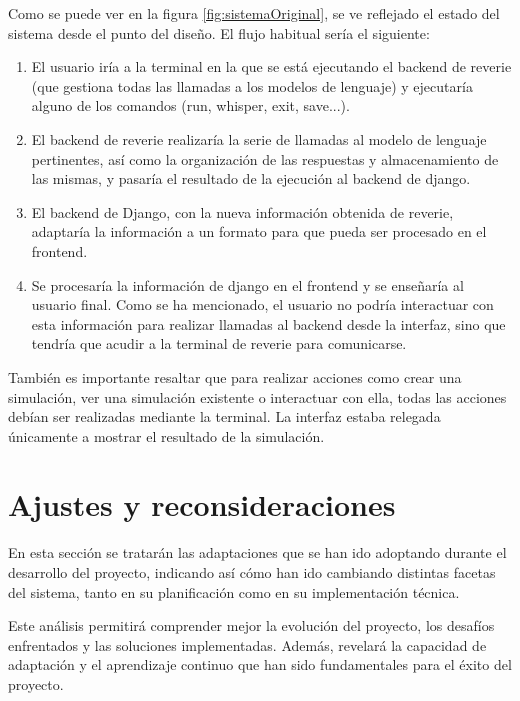 Como se puede ver en la figura \ref{fig:sistemaOriginal}, se ve reflejado el estado del sistema desde el punto del diseño. El flujo habitual sería el siguiente:

\begin{enumerate}
	\item El usuario iría a la terminal en la que se está ejecutando el backend de reverie (que gestiona todas las llamadas a los modelos de lenguaje) y ejecutaría alguno de los comandos (run, whisper, exit, save...).
	
	\item El backend de reverie realizaría la serie de llamadas al modelo de lenguaje pertinentes, así como la organización de las respuestas y almacenamiento de las mismas, y pasaría el resultado de la ejecución al backend de django.
	
	\item El backend de Django, con la nueva información obtenida de reverie, adaptaría la información a un formato para que pueda ser procesado en el frontend.
	
	\item Se procesaría la información de django en el frontend y se enseñaría al usuario final. Como se ha mencionado, el usuario no podría interactuar con esta información para realizar llamadas al backend desde la interfaz, sino que tendría que acudir a la terminal de reverie para comunicarse.
	
\end{enumerate}

También es importante resaltar que para realizar acciones como crear una simulación, ver una simulación existente o interactuar con ella, todas las acciones debían ser realizadas mediante la terminal. La interfaz estaba relegada únicamente a mostrar el resultado de la simulación.

\section{Ajustes y reconsideraciones}

En esta sección se tratarán las adaptaciones que se han ido adoptando durante el desarrollo del proyecto, indicando así cómo han ido cambiando distintas facetas del sistema, tanto en su planificación como en su implementación técnica.

Este análisis permitirá comprender mejor la evolución del proyecto, los desafíos enfrentados y las soluciones implementadas. Además, revelará la capacidad de adaptación y el aprendizaje continuo que han sido fundamentales para el éxito del proyecto.

